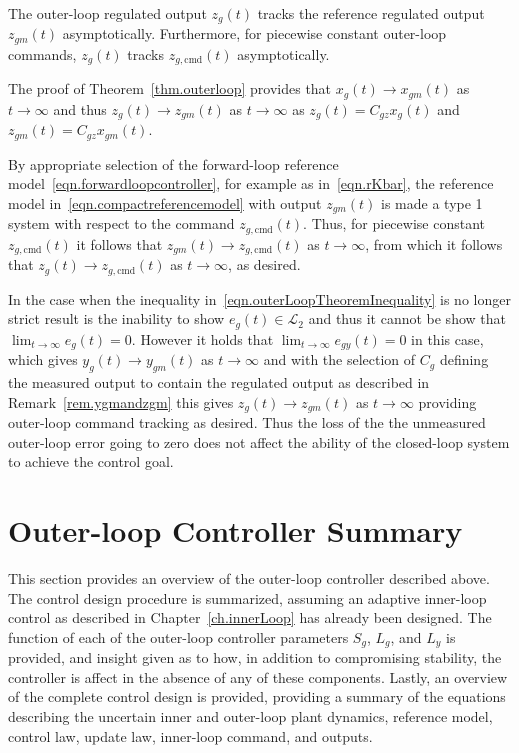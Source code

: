 \begin{cor-dan}\label{cor.zgcmdtracking}
  The outer-loop regulated output $z_{g}(t)$ tracks the reference regulated output $z_{gm}(t)$ asymptotically.
  Furthermore, for piecewise constant outer-loop commands, $z_{g}(t)$ tracks $z_{g,\text{cmd}}(t)$ asymptotically.
\end{cor-dan}

\begin{proof-dan}
  The proof of Theorem~\ref{thm.outerloop} provides that $x_{g}(t)\rightarrow x_{gm}(t)$ as $t\rightarrow\infty$ and thus $z_{g}(t)\rightarrow z_{gm}(t)$ as $t\rightarrow\infty$ as $z_{g}(t) = C_{gz}x_{g}(t)$ and $z_{gm}(t) = C_{gz}x_{gm}(t)$.

  By appropriate selection of the forward-loop reference model\ \eqref{eqn.forwardloopcontroller}, for example as in\ \eqref{eqn.rKbar}, the reference model in\ \eqref{eqn.compactreferencemodel} with output $z_{gm}(t)$ is made a type 1 system with respect to the command $z_{g,\text{cmd}}(t)$.
  Thus, for piecewise constant $z_{g,\text{cmd}}(t)$ it follows that $z_{gm}(t)\rightarrow z_{g,\text{cmd}}(t)$ as $t\rightarrow\infty$, from which it follows that $z_{g}(t)\rightarrow z_{g,\text{cmd}}(t)$ as $t\rightarrow\infty$, as desired.
\end{proof-dan}

\begin{rem-dan}
  In the case when the inequality in\ \eqref{eqn.outerLoopTheoremInequality} is no longer strict result is the inability to show $e_{g}(t)\in\mathcal{L}_{2}$ and thus it cannot be show that $\lim_{t\rightarrow\infty}e_{g}(t)=0$.
  However it holds that $\lim_{t\rightarrow\infty}e_{gy}(t)=0$ in this case, which gives $y_{g}(t)\rightarrow y_{gm}(t)$ as $t\rightarrow\infty$ and with the selection of $C_{g}$ defining the measured output to contain the regulated output as described in Remark~\ref{rem.ygmandzgm} this gives $z_{g}(t)\rightarrow z_{gm}(t)$ as $t\rightarrow\infty$ providing outer-loop command tracking as desired.
  Thus the loss of the the unmeasured outer-loop error going to zero does not affect the ability of the closed-loop system to achieve the control goal.
\end{rem-dan}

\section{Outer-loop Controller Summary}

This section provides an overview of the outer-loop controller described above.
The control design procedure is summarized, assuming an adaptive inner-loop control as described in Chapter~\ref{ch.innerLoop} has already been designed.
The function of each of the outer-loop controller parameters $S_{g}$, $L_{g}$, and $L_{y}$ is provided, and insight given as to how, in addition to compromising stability, the controller is affect in the absence of any of these components.
Lastly, an overview of the complete control design is provided, providing a summary of the equations describing the uncertain inner and outer-loop plant dynamics, reference model, control law, update law, inner-loop command, and outputs.

